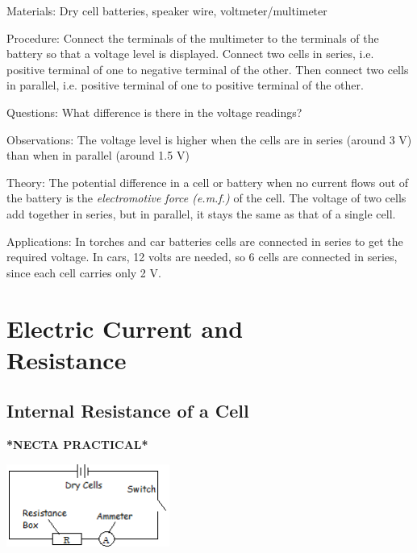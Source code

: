 \begin{multicols}{2}
\begin{description*}
\item[Materials:]{Dry cell batteries, speaker wire, voltmeter/multimeter}
\item[Procedure:]{Connect the terminals of the multimeter to the terminals of the battery so that a voltage level is displayed. Connect two cells in series, i.e. positive terminal of one to negative terminal of the other. Then connect two cells in parallel, i.e. positive terminal of one to positive terminal of the other.}
\item[Questions:]{What difference is there in the voltage readings?}
\item[Observations:]{The voltage level is higher when the cells are in series (around 3 V) than when in parallel (around 1.5 V)}
\item[Theory:]{The potential difference in a cell or battery when no current flows out of the battery is the \emph{electromotive force (e.m.f.)} of the cell. The voltage of two cells add together in series, but in parallel, it stays the same as that of a single cell.}
\item[Applications:]{In torches and car batteries cells are connected in series to get the required voltage. In cars, 12 volts are needed, so 6 cells are connected in series, since each cell carries only 2 V.}
\end{description*}

\vfill
\columnbreak


\section*{Electric Current and \hfill \\ Resistance}


\subsection{Internal Resistance of a Cell}
\textbf{*NECTA PRACTICAL*}

\begin{center}
\includegraphics[width=0.4\textwidth]{./img/ohms-law.png}
\end{center}


\end{multicols}

